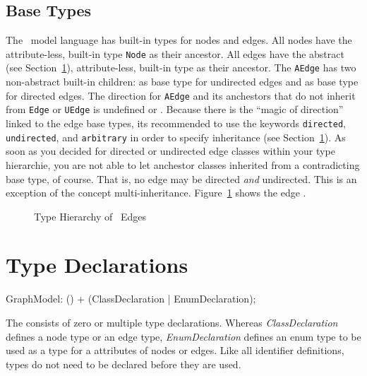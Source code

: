 \subsection{Base Types}
\label{sct:basetypes}
The \GrG\ model language has built-in types for nodes and edges.
All nodes have the attribute-less, built-in type \texttt{Node} as their ancestor.
All edges have the abstract (see Section~\ref{typedecl}), attribute-less, built-in type \texttt{} as their ancestor.
The \texttt{AEdge} has two non-abstract built-in children: \texttt{} as base type for undirected edges and \texttt{} as base type for directed edges.
The direction for \texttt{AEdge} and its anchestors that do not inherit from \texttt{Edge} or \texttt{UEdge} is undefined or .
Because there is the ``magic of direction'' linked to the edge base types, its recommended to use the keywords \texttt{directed}, \texttt{undirected}, and \texttt{arbitrary} in order to specify inheritance (see Section~\ref{typedecl}).
As soon as you decided for directed or undirected edge classes within your type hierarchie, you are not able to let anchestor classes inherited from a contradicting base type, of course.
That is, no edge may be directed \emph{and} undirected.
This is an exception of the concept multi-inheritance.
Figure~\ref{fig:basetypes} shows the edge .
\begin{figure}[htbp]
	\centering
	
	\caption{Type Hierarchy of \GrG\ Edges}
	\label{fig:basetypes}
\end{figure}

\section{Type Declarations}
\label{typedecl}

\begin{rail}
  GraphModel: () + (ClassDeclaration | EnumDeclaration);
\end{rail}
The  consists of zero or multiple type declarations. 
Whereas \emph{ClassDeclaration} defines a node type or an edge type, \emph{EnumDeclaration} defines an enum type to be used as a type for a attributes of nodes or edges.
Like all identifier definitions, types do not need to be declared before they are used.

